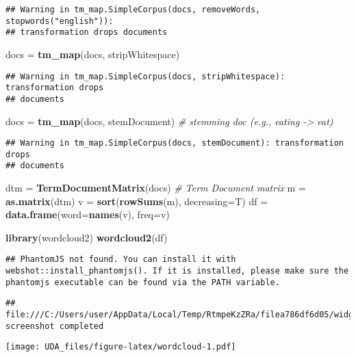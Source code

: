 \documentclass[
]{article}
\newenvironment{Shaded}{\begin{snugshade}}{\end{snugshade}}
\newcommand{\AttributeTok}[1]{\textcolor[rgb]{0.13,0.29,0.53}{#1}}
\newcommand{\CommentTok}[1]{\textcolor[rgb]{0.56,0.35,0.01}{\textit{#1}}}
\newcommand{\FunctionTok}[1]{\textcolor[rgb]{0.13,0.29,0.53}{\textbf{#1}}}
\newcommand{\NormalTok}[1]{#1}
\newcommand{\OtherTok}[1]{\textcolor[rgb]{0.56,0.35,0.01}{#1}}
\begin{document}
\begin{verbatim}
## Warning in tm_map.SimpleCorpus(docs, removeWords, stopwords("english")):
## transformation drops documents
\end{verbatim}

\begin{Shaded}
\begin{Highlighting}[]
\NormalTok{docs }\OtherTok{=} \FunctionTok{tm\_map}\NormalTok{(docs, stripWhitespace)}
\end{Highlighting}
\end{Shaded}

\begin{verbatim}
## Warning in tm_map.SimpleCorpus(docs, stripWhitespace): transformation drops
## documents
\end{verbatim}

\begin{Shaded}
\begin{Highlighting}[]
\NormalTok{docs }\OtherTok{=} \FunctionTok{tm\_map}\NormalTok{(docs, stemDocument) }\CommentTok{\# stemming doc (e.g., eating {-}\textgreater{} eat)}
\end{Highlighting}
\end{Shaded}

\begin{verbatim}
## Warning in tm_map.SimpleCorpus(docs, stemDocument): transformation drops
## documents
\end{verbatim}

\begin{Shaded}
\begin{Highlighting}[]
\NormalTok{dtm }\OtherTok{=} \FunctionTok{TermDocumentMatrix}\NormalTok{(docs) }\CommentTok{\# Term Document matrix}
\NormalTok{m }\OtherTok{=} \FunctionTok{as.matrix}\NormalTok{(dtm)}
\NormalTok{v }\OtherTok{=} \FunctionTok{sort}\NormalTok{(}\FunctionTok{rowSums}\NormalTok{(m), }\AttributeTok{decreasing=}\NormalTok{T)}
\NormalTok{df }\OtherTok{=} \FunctionTok{data.frame}\NormalTok{(}\AttributeTok{word=}\FunctionTok{names}\NormalTok{(v), }\AttributeTok{freq=}\NormalTok{v)}

\FunctionTok{library}\NormalTok{(wordcloud2)}
\FunctionTok{wordcloud2}\NormalTok{(df)}
\end{Highlighting}
\end{Shaded}

\begin{verbatim}
## PhantomJS not found. You can install it with webshot::install_phantomjs(). If it is installed, please make sure the phantomjs executable can be found via the PATH variable.
\end{verbatim}

\begin{verbatim}
## file:///C:/Users/user/AppData/Local/Temp/RtmpeKzZRa/filea786df6d05/widgeta78517550bc.html screenshot completed
\end{verbatim}

\texttt{[image: UDA\_files/figure-latex/wordcloud-1.pdf]}
\end{document}
